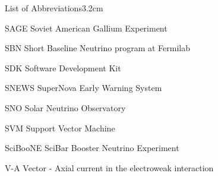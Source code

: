 \begin{mclistof}{List of Abbreviations}{3.2cm}
\item[SAGE] Soviet American Gallium Experiment
\item[SBN] Short Baseline Neutrino program at Fermilab
\item[SDK] Software Development Kit
\item[SNEWS] SuperNova Early Warning System
\item[SNO] Solar Neutrino Observatory
\item[SVM] Support Vector Machine
\item[SciBooNE] SciBar Booster Neutrino Experiment
\item[V-A] Vector - Axial current in the electroweak interaction


\end{mclistof} 
